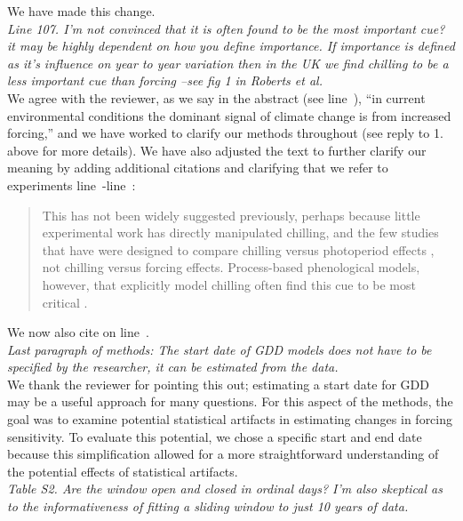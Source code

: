 \documentclass{article}
\newcommand{\lr}[1]{line~\lineref{#1}}
\begin{document}
We have made this change.\\ 

\emph{Line 107. I'm not convinced that it is often found to be the most important cue? it may be highly
dependent on how you define importance. If importance is defined as it's influence on year to year
variation then in the UK we find chilling to be a less important cue than forcing --see fig 1 in Roberts et
al.}\\

We agree with the reviewer, as we say in the abstract (see \lr{unifydebateend}), ``in current environmental conditions the dominant signal of climate change is from increased forcing,'' and we have worked to clarify our methods throughout (see reply to 1. above for more details). We have also adjusted the text to further clarify our meaning by adding additional citations and clarifying that we refer to experiments \lr{eeXstart}-\lr{eeXend}:
\begin{quote}
This has not been widely suggested previously, perhaps because little experimental work has directly manipulated chilling, and the few studies that have were designed to compare chilling versus photoperiod effects \emph{\citep[e.g.,][]{zohner2016,Basler:2014aa,Caffarra:2011qf,Laube:2014a}}, not chilling versus forcing effects. Process-based phenological models, however, that explicitly model chilling often find this cue to be most critical \emph{\citep[e.g.,][]{gauzere2019,Laube:2014a,Heide:2005aa}}.
\end{quote}
We now also cite \citet{roberts2015} on \lr{addedroberts}.\\

\emph{Last paragraph of methods: The start date of GDD models does not have to be specified by the
researcher, it can be estimated from the data.}\\

We thank the reviewer for pointing this out; estimating a start date for GDD \citep[as done in][]{roberts2015} may be a useful approach for many questions. For this aspect of the methods, the goal was to examine potential statistical artifacts in estimating changes in forcing sensitivity. To evaluate this potential, we chose a specific start and end date because this simplification allowed for a more straightforward understanding of the potential effects of statistical artifacts.\\

 \emph{Table S2. Are the window open and closed in ordinal days? I'm also skeptical as to the informativeness of fitting a sliding window to just 10 years of data.}\\
\end{document}
